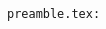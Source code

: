 \begin{frame}
	\begin{multicols}{2}
		\begin{minipage}{.5\textwidth}
			
		\end{minipage}
		\pause
		\lstinline{preamble.tex:}
		
	\end{multicols}
\end{frame}
